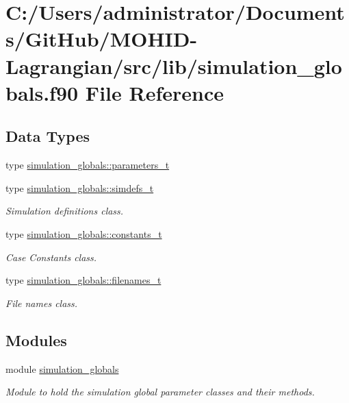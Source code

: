 \hypertarget{simulation__globals_8f90}{}\section{C\+:/\+Users/administrator/\+Documents/\+Git\+Hub/\+M\+O\+H\+I\+D-\/\+Lagrangian/src/lib/simulation\+\_\+globals.f90 File Reference}
\label{simulation__globals_8f90}
\subsection*{Data Types}
\begin{DoxyCompactItemize}
\item 
type \mbox{\hyperlink{structsimulation__globals_1_1parameters__t}{simulation\+\_\+globals\+::parameters\+\_\+t}}
\item 
type \mbox{\hyperlink{structsimulation__globals_1_1simdefs__t}{simulation\+\_\+globals\+::simdefs\+\_\+t}}
\begin{DoxyCompactList}\small\item\em Simulation definitions class. \end{DoxyCompactList}\item 
type \mbox{\hyperlink{structsimulation__globals_1_1constants__t}{simulation\+\_\+globals\+::constants\+\_\+t}}
\begin{DoxyCompactList}\small\item\em Case Constants class. \end{DoxyCompactList}\item 
type \mbox{\hyperlink{structsimulation__globals_1_1filenames__t}{simulation\+\_\+globals\+::filenames\+\_\+t}}
\begin{DoxyCompactList}\small\item\em File names class. \end{DoxyCompactList}\end{DoxyCompactItemize}
\subsection*{Modules}
\begin{DoxyCompactItemize}
\item 
module \mbox{\hyperlink{namespacesimulation__globals}{simulation\+\_\+globals}}
\begin{DoxyCompactList}\small\item\em Module to hold the simulation global parameter classes and their methods. \end{DoxyCompactList}\end{DoxyCompactItemize}
